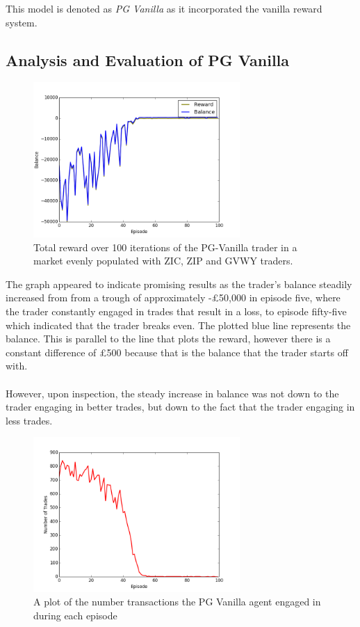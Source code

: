 \documentclass[ %
                    author={Ashwinder Khurana},
                supervisor={Prof Dave Cliff},
                    degree={MEng},
                     title={The Deeply Reinforced Trader},
                  subtitle={},
                      type={enterprise},
                      year={2020} ]{dissertation}
\begin{document}
{\noindent 
This model is denoted as \textit{PG Vanilla} as it incorporated the vanilla reward system. 
\subsection{Analysis and Evaluation of PG Vanilla}
\label{subsection:Analysis and Evaluation of PG Vanilla}

\begin{figure}[H]
	\centering
  	\includegraphics[width=0.7\textwidth]{PG-Vanilla-Reward.png}
  	\caption{Total reward over 100 iterations of the PG-Vanilla trader in a market evenly populated with ZIC, ZIP and GVWY traders. }
	\label{fig:PG-Vanilla-Reward}  
\end{figure}

The graph appeared to indicate promising results as the trader's balance steadily increased from from a trough of approximately -£50,000 in episode five, where the trader constantly engaged in trades that result in a loss, to episode fifty-five which indicated that the trader breaks even. The plotted blue line represents the balance. This is parallel to the line that plots the reward, however there is a constant difference of £500 because that is the balance that the trader starts off with. 
\\
\\
However, upon inspection, the steady increase in balance was not down to the trader engaging in better trades, but down to the fact that the trader engaging in less trades. 

\begin{figure}[H] 
	\centering
  	\includegraphics[width=0.7\textwidth]{PG-Vanilla-Num-Trades.png}
  	\caption{A plot of the number transactions the PG Vanilla agent engaged in during each episode }
	\label{fig:PG-Vanilla-Num-Trades}  
\end{figure}

}
\end{document}
